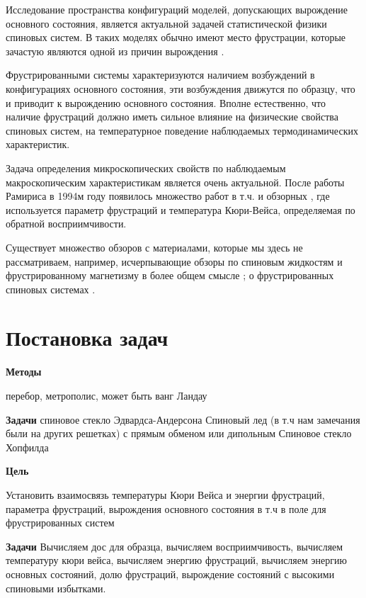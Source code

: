 \documentclass[utf8, babel, sor, jor, amsmath, amssymb, reprint]{elsarticle} %
\begin{document}
Исследование пространства конфигураций моделей, допускающих вырождение основного состояния, является актуальной задачей статистической физики спиновых систем. В таких моделях обычно имеют место фрустрации, которые зачастую являются одной из причин вырождения \cite{trukhin2025low, trukhin2024thermodynamic}. 


Фрустрированными системы характеризуются наличием возбуждений в конфигурациях основного состояния, эти возбуждения движутся по образцу, что и приводит к вырождению основного состояния. Вполне естественно, что наличие фрустраций должно иметь сильное влияние на физические свойства спиновых систем, на температурное поведение наблюдаемых термодинамических характеристик. 

Задача определения микроскопических свойств по наблюдаемым макроскопическим характеристикам является очень актуальной. После работы Рамириса \cite{ramirez1994strongly} в 1994м году появилось множество работ в т.ч. и обзорных \cite{mugiraneza2022tutorial, shaginyan2020theoretical}, где используется параметр фрустраций и температура Кюри-Вейса, определяемая по обратной восприимчивости. 

Существует множество обзоров с материалами, которые мы здесь не рассматриваем, например, исчерпывающие обзоры по спиновым жидкостям \cite{broholm2020quantum} и фрустрированному магнетизму в более общем смысле \cite{shaginyan2020theoretical}; о фрустрированных спиновых системах \cite{holdsworths2020steven}.


\section{Постановка задач}
\label{sec1}

\textbf{Методы} 


перебор,  метрополис, может быть ванг Ландау 

\textbf{Задачи} 
спиновое стекло Эдвардса-Андерсона 
Спиновый лед (в т.ч нам замечания были на других решетках) с прямым обменом или дипольным
Спиновое стекло Хопфилда

\textbf{Цель} 

Установить взаимосвязь температуры Кюри Вейса и энергии фрустраций, параметра фрустраций, вырождения основного состояния в т.ч в поле для фрустрированных систем

\textbf{Задачи}
Вычисляем дос для образца, вычисляем восприимчивость, вычисляем температуру кюри вейса, вычисляем энергию фрустраций, вычисляем энергию основных состояний, долю фрустраций, вырождение состояний с высокими спиновыми избытками.
\end{document}
